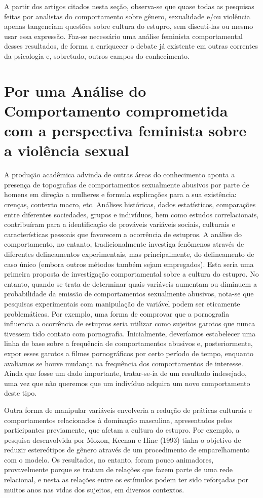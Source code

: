A partir dos artigos citados nesta seção, observa-se que quase todas as pesquisas feitas por analistas do comportamento sobre gênero, sexualidade e/ou violência apenas tangenciam questões sobre cultura do estupro, sem discuti-las ou mesmo usar essa expressão. Faz-se necessário uma análise feminista comportamental desses resultados, de forma a enriquecer o debate já existente em outras correntes da psicologia e, sobretudo, outros campos do conhecimento.

\section{Por uma Análise do Comportamento comprometida com a perspectiva feminista sobre a violência sexual}

A produção acadêmica advinda de outras áreas do conhecimento aponta a presença de topografias de comportamentos sexualmente abusivos por parte de homens em direção a mulheres e formula explicações para a sua existência: crenças, contexto macro, etc. Análises históricas, dados estatísticos, comparações entre diferentes sociedades, grupos e indivíduos, bem como estudos correlacionais, contribuíram para a identificação de prováveis variáveis sociais, culturais e características pessoais que favorecem a ocorrência de estupros. A análise do comportamento, no entanto, tradicionalmente investiga fenômenos através de diferentes delineamentos experimentais, mas principalmente, do delineamento de caso único (embora outros métodos também sejam empregados). Esta seria uma primeira proposta de investigação comportamental sobre a cultura do estupro. No entanto, quando se trata de determinar quais variáveis aumentam ou diminuem a probabilidade da emissão de comportamentos sexualmente abusivos, nota-se que pesquisas experimentais com manipulação de variável podem ser eticamente problemáticas. Por exemplo, uma forma de comprovar que a pornografia influencia a ocorrência de estupros seria utilizar como sujeitos garotos que nunca tivessem tido contato com pornografia. Inicialmente, deveríamos estabelecer uma linha de base sobre a frequência de comportamentos abusivos e, posteriormente, expor esses garotos a filmes pornográficos por certo período de tempo, enquanto avaliamos se houve mudança na frequência dos comportamentos de interesse. Ainda que fosse um dado importante, tratar-se-ia de um resultado indesejado, uma vez que não queremos que um indivíduo adquira um novo comportamento deste tipo.

Outra forma de manipular variáveis envolveria a redução de práticas culturais e comportamentos relacionados à dominação masculina, apresentados pelos participantes previamente, que afetam a cultura do estupro. Por exemplo, a pesquisa desenvolvida por Moxon, Keenan e Hine (1993) tinha o objetivo de reduzir estereótipos de gênero através de um procedimento de emparelhamento com o modelo. Os resultados, no entanto, foram pouco animadores, provavelmente porque se tratam de relações que fazem parte de uma rede relacional, e nesta as relações entre os estímulos podem ter sido reforçadas por muitos anos nas vidas dos sujeitos, em diversos contextos.

